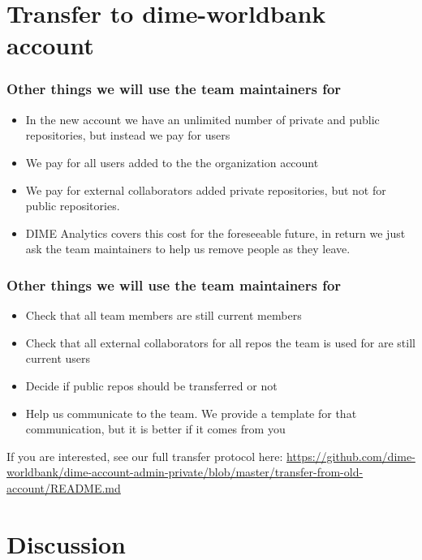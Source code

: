 \documentclass[aspectratio=169]{beamer} %
\begin{document}

\section{Transfer to dime-worldbank account}

\begin{frame}
	\frametitle{Other things we will use the team maintainers for}
	
	\begin{itemize}
		\item In the new account we have an unlimited number of private and public repositories, but instead we pay for users
		\item We pay for all users added to the the organization account
		\item We pay for external collaborators added private repositories, but not for public repositories.
		\item DIME Analytics covers this cost for the foreseeable future, in return we just ask the team maintainers to help us remove people as they leave.
	\end{itemize}
\end{frame}


\begin{frame}
	\frametitle{Other things we will use the team maintainers for}
	
	\begin{itemize}
		\item Check that all team members are still current members
		\item Check that all external collaborators for all repos the team is used for are still current users
		\item Decide if public repos should be transferred or not
		\item Help us communicate to the team. We provide a template for that communication, but it is better if it comes from you
	\end{itemize}

	 If you are interested, see our full transfer protocol here: \url{https://github.com/dime-worldbank/dime-account-admin-private/blob/master/transfer-from-old-account/README.md}
\end{frame}


\section{Discussion}
\end{document}
